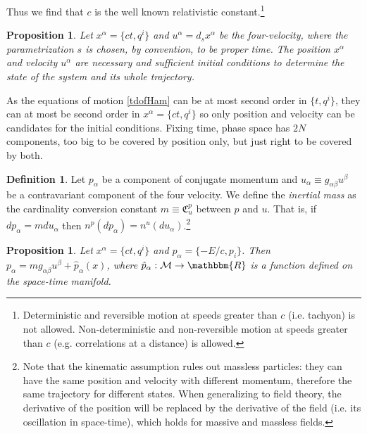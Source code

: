 \documentclass[aps,pra,10pt,twocolumn,floatfix,nofootinbib]{revtex4-1}
\newtheorem{prop}[thm]{Proposition}
\theoremstyle{definition}
\newtheorem{defn}[thm]{Definition}
\begin{document}
Thus we find that $c$ is the well known relativistic constant.\footnote{Deterministic and reversible motion at speeds greater than $c$ (i.e. tachyon) is not allowed. Non-deterministic and non-reversible motion at speeds greater than $c$ (e.g. correlations at a distance) is allowed.}

\begin{prop}\label{initialConditions}
Let $x^\alpha=\{ct, q^i\}$ and $u^\alpha = d_s x^\alpha$ be the four-velocity, where the parametrization $s$ is chosen, by convention, to be proper time. The position $x^\alpha$ and velocity $u^\alpha$ are necessary and sufficient initial conditions to determine the state of the system and its whole trajectory.
\end{prop}

As the equations of motion \ref{tdofHam} can be at most second order in $\{t, q^i\}$, they can at most be second order in $x^\alpha=\{ct, q^i\}$ so only position and velocity can be candidates for the initial conditions. Fixing time, phase space has $2N$ components, too big to be covered by position only, but just right to be covered by both.

\begin{defn}\label{inertialMass}
Let $p_\alpha$ be a component of conjugate momentum and $u_\alpha \equiv g_{\alpha \beta}u^\beta$ be a contravariant component of the four velocity. We define the \emph{inertial mass} as the cardinality conversion constant $m \equiv \mathfrak{C}^p_u$ between $p$ and $u$. That is, if $dp_\alpha=mdu_\alpha$ then $n^p(dp_\alpha)=n^u(du_\alpha)$.\footnote{Note that the kinematic assumption rules out massless particles: they can have the same position and velocity with different momentum, therefore the same trajectory for different states. When generalizing to field theory, the derivative of the position will be replaced by the derivative of the field (i.e. its oscillation in space-time), which holds for massive and massless fields.}
\end{defn}

\begin{prop}\label{kineticMomentum}
Let $x^\alpha=\{ct, q^i\}$ and $p_\alpha=\{-E/c, p_i\}$. Then $p_\alpha= m g_{\alpha \beta}u^\beta + \hat{p}_\alpha(x)$, where $\hat{p}_\alpha : \mathcal{M} \rightarrow \mathbbm{R}$ is a function defined on the space-time manifold.
\end{prop}
\end{document}
